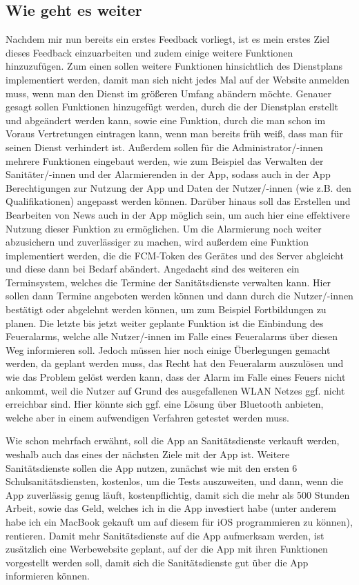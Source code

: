 \subsection{Wie geht es weiter}
Nachdem mir nun bereits ein erstes Feedback vorliegt, ist es mein erstes Ziel dieses Feedback einzuarbeiten und zudem einige weitere Funktionen
hinzuzufügen. Zum einen sollen weitere Funktionen hinsichtlich des Dienstplans implementiert werden, damit man sich nicht jedes Mal auf der
Website anmelden muss, wenn man den Dienst im größeren Umfang abändern möchte. Genauer gesagt sollen Funktionen hinzugefügt werden, durch die 
der Dienstplan erstellt und abgeändert werden kann, sowie eine Funktion, durch die man schon im Voraus Vertretungen eintragen kann, wenn man 
bereits früh weiß, dass man für seinen Dienst verhindert ist. Außerdem sollen für die Administrator/-innen mehrere Funktionen eingebaut werden, 
wie zum Beispiel das Verwalten der Sanitäter/-innen und der Alarmierenden in der App, sodass auch in der App Berechtigungen zur Nutzung der App und Daten der 
Nutzer/-innen (wie z.B. den Qualifikationen) angepasst werden können. Darüber hinaus soll das Erstellen und Bearbeiten von News auch in der App möglich sein, um auch hier
eine effektivere Nutzung dieser Funktion zu ermöglichen. Um die Alarmierung noch weiter abzusichern und zuverlässiger zu machen, wird außerdem eine
Funktion implementiert werden, die die FCM-Token des Gerätes und des Server abgleicht und diese dann bei Bedarf abändert.
Angedacht sind des weiteren ein Terminsystem, welches die Termine der Sanitätsdienste verwalten kann. Hier sollen dann Termine angeboten werden 
können und dann durch die Nutzer/-innen bestätigt oder abgelehnt werden können, um zum Beispiel Fortbildungen zu planen.
Die letzte bis jetzt weiter geplante Funktion ist die Einbindung des Feueralarms, welche alle Nutzer/-innen im Falle eines Feueralarms
über diesen Weg informieren soll. Jedoch müssen hier noch einige Überlegungen gemacht werden, da geplant werden muss, das Recht hat den Feueralarm
auszulösen und wie das Problem gelöst werden kann, dass der Alarm im Falle eines Feuers nicht ankommt, weil die Nutzer auf Grund 
des ausgefallenen WLAN Netzes ggf. nicht erreichbar sind. Hier könnte sich ggf. eine Lösung über Bluetooth
anbieten, welche aber in einem aufwendigen Verfahren getestet werden muss.

Wie schon mehrfach erwähnt, soll die App an Sanitätsdienste verkauft werden, weshalb auch das eines der nächsten 
Ziele mit der App ist. Weitere Sanitätsdienste sollen die App nutzen, zunächst wie mit den ersten 6 Schulsanitätsdiensten, kostenlos,
um die Tests auszuweiten, und dann, wenn die App zuverlässig genug läuft, kostenpflichtig, damit sich die mehr als 500 Stunden Arbeit, sowie 
das Geld, welches ich in die App investiert habe (unter anderem habe ich ein MacBook gekauft um auf diesem für iOS programmieren zu können), rentieren. Damit mehr Sanitätsdienste auf die App aufmerksam werden, ist zusätzlich eine Werbewebsite
geplant, auf der die App mit ihren Funktionen vorgestellt werden soll, damit sich die Sanitätsdienste gut über die App informieren können.

